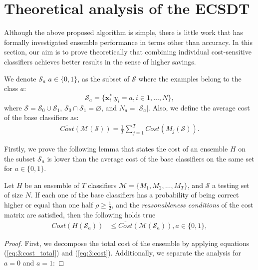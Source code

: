 {\newpage 
\section{Theoretical analysis of the ECSDT}
\label{sec:9:theoretical}

  Although the above proposed algorithm is simple, there is little work that has formally 
  investigated ensemble performance in terms other than accuracy. In this section, our aim is to 
  prove theoretically that combining individual cost-sensitive classifiers achieves better results 
  in the sense of higher savings.
  
  We denote $\mathcal{S}_a$ $a\in \{0,1\}$, as the subset of $\mathcal{S}$ 
  where the examples belong to the class $a$:
  \begin{equation}\label{eq:9:S_a}
    \mathcal{S}_a = \{\mathbf{x}_i^* \vert y_i = a, i \in 1,\dots,N\},
  \end{equation}
  where $\mathcal{S}=\mathcal{S}_0 \cup \mathcal{S}_1$, $\mathcal{S}_0 \cap \mathcal{S}_1 = 
  \varnothing$, and $N_a=\vert \mathcal{S}_a \vert$. Also, we define the average cost of the base 
  classifiers as:
  \begin{align}\label{eq:9:avg_cost}
    \overline{Cost} (\mathcal{M}(\mathcal{S}))= \frac{1}{T} \sum_{j=1}^{T} Cost(M_j(\mathcal{S})). 
  \end{align}
  
  \noindent Firstly, we prove the following lemma that states the cost of an ensemble $H$ on the 
  subset $\mathcal{S}_a$ is lower than the average cost of the base classifiers on the same set for 
  $a  \in \{0,1\}$.

  \begin{lemma}\label{lemma1}
  Let $H$ be an ensemble of $T$ classifiers $\mathcal{M}=\{M_1, M_2,\dots,M_T\}$, and 
  $\mathcal{S}$ a testing set of size $N$. If each one of the base classifiers has a probability 
  of being correct higher or equal than one half $\rho \ge \frac{1}{2}$, and the 
  \textit{reasonableness conditions} of the cost matrix are satisfied, then the following holds true
  \begin{align}\label{eq:9:lemma}
    Cost(H(\mathcal{S}_a)) &\le \overline{Cost} (\mathcal{M}(\mathcal{S}_a)) , a  \in\{0,1\}, 
  \end{align}
  \end{lemma}
  
  \begin{proof}
  First, we decompose the total cost of the ensemble by applying equations (\ref{eq:3:cost_total}) 
  and (\ref{eq:3:cost}). Additionally, we separate the analysis for $a=0$ and $a=1$:


\end{proof}}
